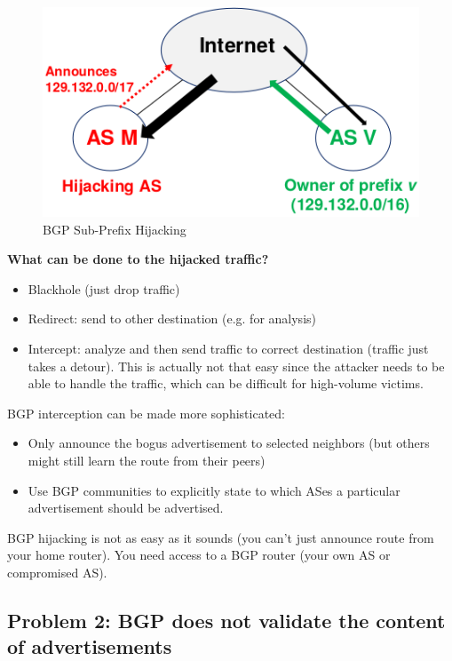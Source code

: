 \documentclass[11pt,oneside,a4paper]{article}
\begin{document}
\begin{figure}
	\centering
	\includegraphics[width=0.4\linewidth]{figures/bgp_subprefix_hijack}
	\caption{BGP Sub-Prefix Hijacking}
	\label{fig:bgpsubprefixhijack}
\end{figure}

\noindent \textbf{What can be done to the hijacked traffic?}

\vspace{-\topsep}
\begin{itemize}
	\setlength{\itemsep}{0pt}
	\setlength{\parskip}{0pt}
	\item Blackhole (just drop traffic)
	\item Redirect: send to other destination (e.g. for analysis)
	\item Intercept: analyze and then send traffic to correct destination (traffic just takes a detour). This is actually not that easy since the attacker needs to be able to handle the traffic, which can be difficult for high-volume victims.
\end{itemize}
\vspace{-\topsep}

\noindent BGP interception can be made more sophisticated:

\vspace{-\topsep}
\begin{itemize}
	\setlength{\itemsep}{0pt}
	\setlength{\parskip}{0pt}
	\item Only announce the bogus advertisement to selected neighbors (but others might still learn the route from their peers)
	\item Use BGP communities to explicitly state to which ASes a particular advertisement should be advertised.
\end{itemize}
\vspace{-\topsep}

\noindent BGP hijacking is not as easy as it sounds (you can't just announce route from your home router). You need access to a BGP router (your own AS or compromised AS).

\subsection{Problem 2: BGP does not validate the content of	advertisements}
\end{document}
